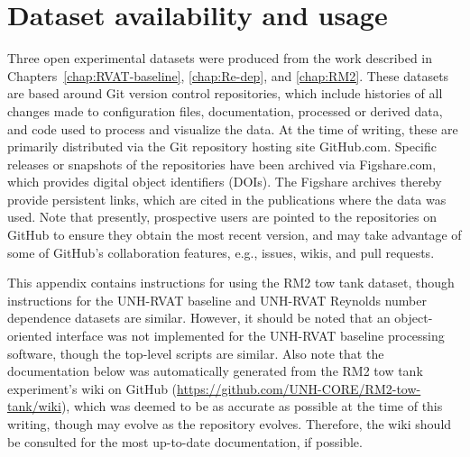 \chapter{Dataset availability and usage}
\doublespace

Three open experimental datasets were produced from the work described in
Chapters~\ref{chap:RVAT-baseline}, \ref{chap:Re-dep}, and \ref{chap:RM2}. These
datasets are based around Git version control repositories, which include
histories of all changes made to configuration files, documentation, processed
or derived data, and code used to process and visualize the data. At the time of
writing, these are primarily distributed via the Git repository hosting site
GitHub.com. Specific releases or snapshots of the repositories have been
archived via Figshare.com, which provides digital object identifiers (DOIs). The
Figshare archives thereby provide persistent links, which are cited in the
publications where the data was used. Note that presently, prospective users are
pointed to the repositories on GitHub to ensure they obtain the most recent
version, and may take advantage of some of GitHub's collaboration features,
e.g., issues, wikis, and pull requests.

This appendix contains instructions for using the RM2 tow tank dataset, though
instructions for the UNH-RVAT baseline and UNH-RVAT Reynolds number dependence
datasets are similar. However, it should be noted that an object-oriented
interface was not implemented for the UNH-RVAT baseline processing software,
though the top-level scripts are similar. Also note that the documentation below
was automatically generated from the RM2 tow tank experiment's wiki on GitHub
(\url{https://github.com/UNH-CORE/RM2-tow-tank/wiki}), which was deemed to be as
accurate as possible at the time of this writing, though may evolve as the
repository evolves. Therefore, the wiki should be consulted for the most
up-to-date documentation, if possible.



